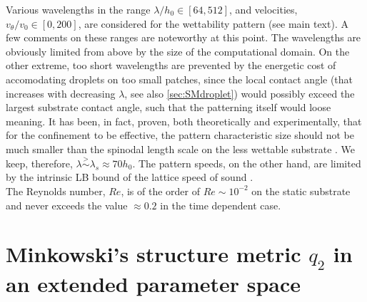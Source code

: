 \documentclass[amsmath,amssymb,showpacs,prl,superscriptaddress,notitlepage]{revtex4-1}
\begin{document}
Various wavelengths in the range $\lambda/h_0 \in [64, 512]$, and velocities,
$v_{\theta}/v_0 \in [0, 200]$, are considered for the wettability pattern (see main text). 
A few comments on these ranges are noteworthy at this point. The wavelengths are obviously limited from above by the size of the
computational domain. On the other extreme, too short wavelengths are prevented by
the energetic cost of accomodating droplets on too
small patches, since the local contact angle 
(that increases with decreasing $\lambda$, see also \ref{sec:SMdroplet}) would possibly exceed the largest substrate contact angle,
such that the patterning itself would loose meaning. 
It has been, in fact, proven, both theoretically and experimentally, that 
for the confinement to be effective, the pattern characteristic size should 
not be much smaller than the spinodal length scale on the less wettable substrate
\cite{KarguptaJCP2002,KarguptaLangmuir2000,Nisato1999,Karim1998}.
We keep, therefore, $\lambda \stackrel{>}{\sim} \lambda_s \approx 70 h_0$.
The pattern speeds, on the other hand, are limited by the intrinsic LB bound of the lattice speed of sound
 \cite{succi}.\\
The Reynolds number, $Re$, is of the order of $Re \sim 10^{-2}$ on the 
static substrate and never exceeds the value $\approx 0.2$ in the time dependent case.

\section{Minkowski's structure metric $q_2$ in an extended parameter space}\label{sec:SMMinko}
\end{document}
